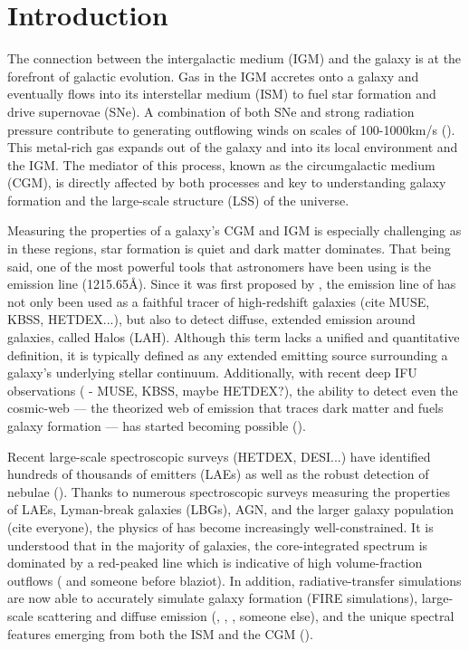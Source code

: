 \documentclass[linenumbers,amsmath,trackchanges,preprint2]{aastex702}
\begin{document}
\section{Introduction}
\par The connection between the intergalactic medium (IGM) and the galaxy is at the forefront of galactic evolution. Gas in the IGM accretes onto a galaxy and eventually flows into its interstellar medium (ISM) to fuel star formation and drive supernovae (SNe). A combination of both SNe and strong radiation pressure contribute to generating outflowing winds on scales of 100-1000km/s (\cite{?}). This metal-rich gas expands out of the galaxy and into its local environment and the IGM. The mediator of this process, known as the circumgalactic medium (CGM), is directly affected by both processes and key to understanding galaxy formation and the large-scale structure (LSS) of the universe.
\par Measuring the properties of a galaxy's CGM and IGM is especially challenging as in these regions, star formation is quiet and dark matter dominates. That being said, one of the most powerful tools that astronomers have been using is the \lya emission line (1215.65\AA). Since it was first proposed by \cite{PartridgePeebles1967}, the emission line of \lya has not only been used as a faithful tracer of high-redshift galaxies (cite MUSE, KBSS, HETDEX...), but also to detect diffuse, extended emission around galaxies, called \lya Halos (LAH). Although this term lacks a unified and quantitative definition, it is typically defined as any extended \lya emitting source surrounding a galaxy's underlying stellar continuum. Additionally, with recent deep IFU observations (\cite{?} - MUSE, KBSS, maybe HETDEX?), the ability to detect even the cosmic-web --- the theorized web of emission that traces dark matter and fuels galaxy formation --- has started becoming possible (\cite{tornotti2025}).
\par Recent large-scale spectroscopic surveys (HETDEX, DESI...) have identified hundreds of thousands of \lya emitters (LAEs) as well as the robust detection of \lya nebulae (\cite{cooper2026}). Thanks to numerous spectroscopic surveys measuring the properties of LAEs, Lyman-break galaxies (LBGs), AGN, and the larger galaxy population (cite everyone), the physics of \lya has become increasingly well-constrained. It is understood that in the majority of galaxies, the core-integrated spectrum is dominated by a red-peaked \lya line which is indicative of high volume-fraction outflows (\cite{blaizot2023} and someone before blaziot). In addition, radiative-transfer simulations are now able to accurately simulate galaxy formation (FIRE simulations), large-scale scattering and diffuse emission (\cite{lake2015}, \cite{byrohl2021}, \cite{byrohl2023}, someone else), and the unique spectral features emerging from both the ISM and the CGM (\cite{blaizot2023}). 
\end{document}
